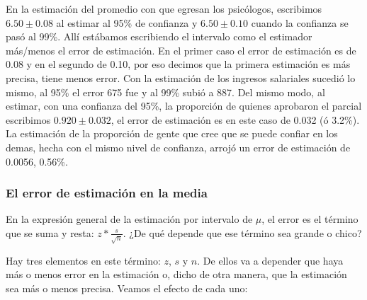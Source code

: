 \documentclass[]{book}
\begin{document}
En la estimación del promedio con que egresan los psicólogos, escribimos
\(6.50 \pm 0.08\) al estimar al 95\% de confianza y \(6.50 \pm 0.10\) cuando
la confianza se pasó al 99\%. Allí estábamos escribiendo el intervalo
como el estimador más/menos el error de estimación. En el primer caso el
error de estimación es de 0.08 y en el segundo de 0.10, por eso decimos
que la primera estimación es más precisa, tiene menos error.
Con la estimación de los ingresos salariales sucedió lo mismo, al 95\% el error 675 fue y al 99\% subió a 887.
Del mismo modo, al estimar, con una confianza del 95\%, la proporción de
quienes aprobaron el parcial escribimos \(0.920 \pm 0.032\), el error de
estimación es en este caso de 0.032 (ó 3.2\%). La estimación de la proporción de gente que cree que se puede confiar en los demas, hecha con el mismo nivel de confianza, arrojó un error de estimación de 0.0056, 0.56\%.

\hypertarget{el-error-de-estimaciuxf3n-en-la-media}{%
\subsubsection{El error de estimación en la media}\label{el-error-de-estimaciuxf3n-en-la-media}}

En la expresión general de la estimación por intervalo de \(\mu\), el
error es el término que se suma y resta: \(z*\frac{s}{\sqrt{n}}\). ¿De qué
depende que ese término sea grande o chico?

Hay tres elementos en este término: \(z\), \(s\) y \(n\). De ellos va a
depender que haya más o menos error en la estimación o, dicho de otra
manera, que la estimación sea más o menos precisa. Veamos el efecto de
cada uno:
\end{document}

